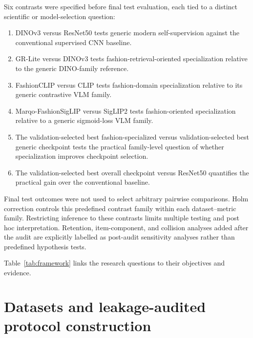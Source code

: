 \documentclass[preprint,12pt]{elsarticle}
\begin{document}
Six contrasts were specified before final test evaluation, each tied to a distinct scientific or model-selection question:
\begin{enumerate}
\item DINOv3 versus ResNet50 tests generic modern self-supervision against the conventional supervised CNN baseline.
\item GR-Lite versus DINOv3 tests fashion-retrieval-oriented specialization relative to the generic DINO-family reference.
\item FashionCLIP versus CLIP tests fashion-domain specialization relative to its generic contrastive VLM family.
\item Marqo-FashionSigLIP versus SigLIP2 tests fashion-oriented specialization relative to a generic sigmoid-loss VLM family.
\item The validation-selected best fashion-specialized versus validation-selected best generic checkpoint tests the practical family-level question of whether specialization improves checkpoint selection.
\item The validation-selected best overall checkpoint versus ResNet50 quantifies the practical gain over the conventional baseline.
\end{enumerate}
Final test outcomes were not used to select arbitrary pairwise comparisons. Holm correction controls this predefined contrast family within each dataset--metric family. Restricting inference to these contrasts limits multiple testing and post hoc interpretation. Retention, item-component, and collision analyses added after the audit are explicitly labelled as post-audit sensitivity analyses rather than predefined hypothesis tests.



Table~\ref{tab:framework} links the research questions to their objectives and evidence.

\section{Datasets and leakage-audited protocol construction}\label{sec:datasets}
\end{document}
